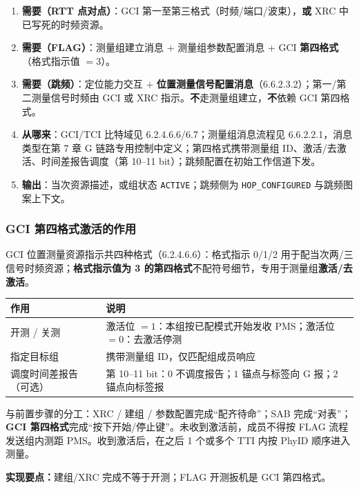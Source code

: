 \documentclass[11pt,a4paper]{ctexart}
\begin{document}
\begin{enumerate}
  \item \textbf{需要（RTT 点对点）}：GCI 第一至第三格式（时频/端口/波束），\textbf{或} XRC 中已写死的时频资源。
  \item \textbf{需要（FLAG）}：测量组建立消息 + 测量组参数配置消息 + GCI \textbf{第四格式}（格式指示值 $=3$）。
  \item \textbf{需要（跳频）}：定位能力交互 + \textbf{位置测量信号配置消息}（6.6.2.3.2）；第一/第二测量信号时频由 GCI 或 XRC 指示。\textbf{不}走测量组建立，\textbf{不}依赖 GCI 第四格式。
  \item \textbf{从哪来}：GCI/TCI 比特域见 6.2.4.6.6/6.7；测量组消息流程见 6.6.2.2.1，消息类型在第 7 章 G 链路专用控制中定义；第四格式携带测量组 ID、激活/去激活、时间差报告调度（第 10--11 bit）；跳频配置在初始工作信道下发。
  \item \textbf{输出}：当次资源描述，或组状态 \texttt{ACTIVE}；跳频侧为 \texttt{HOP\_CONFIGURED} 与跳频图案上下文。
\end{enumerate}

\subsubsection{GCI 第四格式激活的作用}

GCI 位置测量资源指示共四种格式（6.2.4.6.6）：格式指示 0/1/2 用于配当次两/三信号时频资源；\textbf{格式指示值为 3 的第四格式}不配符号细节，专用于测量组\textbf{激活/去激活}。

\begin{table}[h]
\centering
\small
\begin{tabular}{L{3cm}L{10cm}}
\toprule
\textbf{作用} & \textbf{说明} \\
\midrule
开测 / 关测 & 激活位 $=1$：本组按已配模式开始发收 PMS；激活位 $=0$：去激活停测 \\
指定目标组 & 携带测量组 ID，仅匹配组成员响应 \\
调度时间差报告（可选） & 第 10--11 bit：$0$ 不调度报告；$1$ 锚点与标签向 G 报；$2$ 锚点向标签报 \\
\bottomrule
\end{tabular}
\end{table}

与前置步骤的分工：XRC / 建组 / 参数配置完成``配齐待命''；SAB 完成``对表''；\textbf{GCI 第四格式}完成``按下开始/停止键''。未收到激活前，成员不得按 FLAG 流程发送组内测距 PMS。收到激活后，在之后 1 个或多个 TTI 内按 PhyID 顺序进入测量。

\noindent\textbf{实现要点：}建组/XRC 完成不等于开测；FLAG 开测扳机是 GCI 第四格式。
\end{document}
